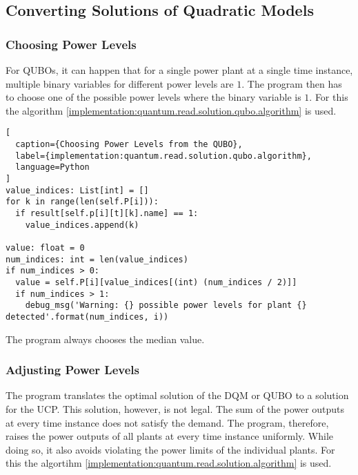 \subsection{Converting Solutions of Quadratic Models}
\label{implementation:quantum.transform.solution}


\subsubsection{Choosing Power Levels}

For QUBOs, it can happen that for a single power plant at a single time instance, multiple binary variables for different power levels are $1$.
The program then has to choose one of the possible power levels where the binary variable is $1$.
For this the algorithm \ref{implementation:quantum.read.solution.qubo.algorithm} is used.

\begin{lstlisting}[
  caption={Choosing Power Levels from the QUBO},
  label={implementation:quantum.read.solution.qubo.algorithm},
  language=Python
]
value_indices: List[int] = []
for k in range(len(self.P[i])):
  if result[self.p[i][t][k].name] == 1:
    value_indices.append(k)

value: float = 0
num_indices: int = len(value_indices)
if num_indices > 0:
  value = self.P[i][value_indices[(int) (num_indices / 2)]]
  if num_indices > 1:
    debug_msg('Warning: {} possible power levels for plant {} detected'.format(num_indices, i))
\end{lstlisting}

The program always chooses the median value.

\subsubsection{Adjusting Power Levels}

The program translates the optimal solution of the DQM or QUBO to a solution for the UCP.
This solution, however, is not legal.
The sum of the power outputs at every time instance does not satisfy the demand.
The program, therefore, raises the power outputs of all plants at every time instance uniformly.
While doing so, it also avoids violating the power limits of the individual plants.
For this the algortihm \ref{implementation:quantum.read.solution.algorithm} is used.

